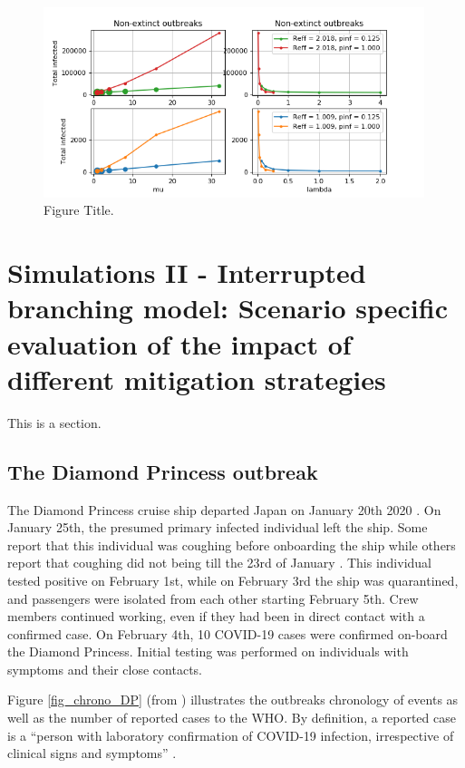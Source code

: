 \documentclass[sr]{drdc-report}
\begin{document}
\begin{figure}
  \includegraphics[width=0.99\textwidth, keepaspectratio=true]{figures/NinfOut_exp1}
  \caption{Figure Title.}\label{fig_plt_NinfOutExp1}
\end{figure}

\newpage

\section{Simulations II - Interrupted branching model: Scenario specific evaluation of the impact of different mitigation strategies }
This is a section.

\subsection{The Diamond Princess outbreak}

The Diamond Princess cruise ship departed Japan on January 20th 2020 \cite{10..15585/mmwr..mm6912e3}. On January 25th, the presumed primary infected individual left the ship. Some report that this individual was coughing before onboarding the ship \cite{10..1016/j..ijid..2020..02..033} while others report that coughing did not being till the 23rd of January \cite{news_patient_zero}. This individual tested positive on February 1st, while on February 3rd the ship was quarantined, and passengers were isolated from each other starting February 5th. Crew members continued working, even if they had been in direct contact with a confirmed case. On February 4th, 10 COVID-19 cases were confirmed on-board the Diamond Princess. Initial testing was performed on individuals with symptoms and their close contacts. 

Figure \ref{fig_chrono_DP}  (from \cite{10..15585/mmwr..mm6912e3}) illustrates the outbreaks chronology of events as well as the number of reported cases to the WHO. By definition, a reported case is a “person with laboratory confirmation of COVID-19 infection, irrespective of clinical signs and symptoms” \cite{WHO_surv}. 
\end{document}
